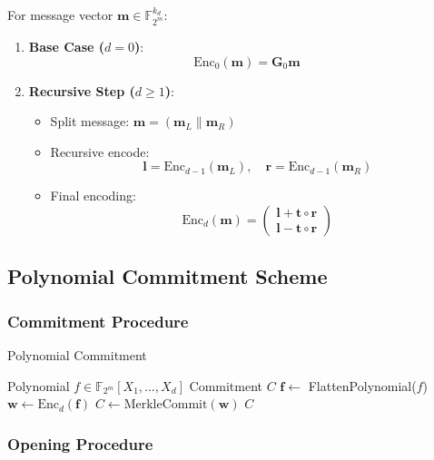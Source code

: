 \documentclass{article}
\theoremstyle{plain}
\theoremstyle{definition}
\theoremstyle{remark}
\theoremstyle{problem}
\begin{document}
For message vector $\mathbf{m} \in \mathbb{F}_{2^m}^{k_d}$:

\begin{enumerate}
    \item \textbf{Base Case ($d = 0$)}:
    \[
    \text{Enc}_0(\mathbf{m}) = \mathbf{G}_0 \mathbf{m}
    \]

    \item \textbf{Recursive Step ($d \geq 1$)}:
    \begin{itemize}
        \item Split message: $\mathbf{m} = (\mathbf{m}_L \| \mathbf{m}_R)$
        \item Recursive encode:
        \[
        \mathbf{l} = \text{Enc}_{d-1}(\mathbf{m}_L), \quad \mathbf{r} = \text{Enc}_{d-1}(\mathbf{m}_R)
        \]
        \item Final encoding:
        \[
        \text{Enc}_d(\mathbf{m}) = \begin{pmatrix}
        \mathbf{l} + \mathbf{t} \circ \mathbf{r} \\
        \mathbf{l} - \mathbf{t} \circ \mathbf{r}
        \end{pmatrix}
        \]
    \end{itemize}
\end{enumerate}

\subsection{Polynomial Commitment Scheme}

\subsubsection{Commitment Procedure}

\begin{algorithm}
\caption{Polynomial Commitment}
\begin{algorithmic}[1]
\Require Polynomial $f \in \mathbb{F}_{2^m}[X_1, \dots, X_d]$
\Ensure Commitment $C$
\State $\mathbf{f} \gets$ FlattenPolynomial($f$)
\State $\mathbf{w} \gets \text{Enc}_d(\mathbf{f})$
\State $C \gets \text{MerkleCommit}(\mathbf{w})$
\State \Return $C$
\end{algorithmic}
\end{algorithm}

\subsubsection{Opening Procedure}
\end{document}
